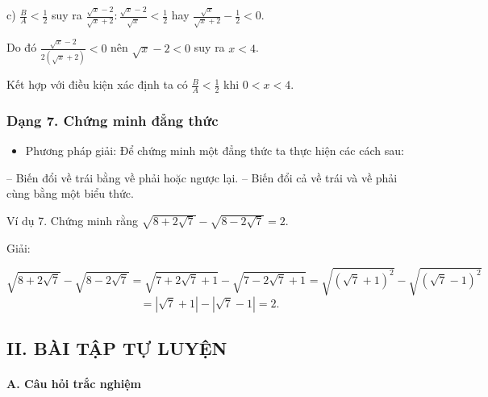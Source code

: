 \documentclass[%
    fontsize=12pt,%
    chapterprefix=false,%
    open=right,%
    twoside=false,%
    numbers=noenddot,%
    headings=optiontohead,%
    final,%
    DIV=15,%
    parskip=half %
]{scrbook}
\begin{document}
c) $ \frac{B}{A} < \frac{1}{2} $ suy ra $ \frac{\sqrt{x}-2}{\sqrt{x}+2} : \frac{\sqrt{x}-2}{\sqrt{x}} < \frac{1}{2} $ hay $ \frac{\sqrt{x}}{\sqrt{x}+2} - \frac{1}{2} < 0 $.

Do đó $ \frac{\sqrt{x}-2}{2(\sqrt{x}+2)} < 0 $ nên $ \sqrt{x}-2 < 0 $ suy ra $ x < 4 $.

Kết hợp với điều kiện xác định ta có $ \frac{B}{A} < \frac{1}{2} $ khi $ 0 < x < 4 $.
\subsubsection{Dạng 7. Chứng minh đẳng thức}

\begin{itemize}
  \item Phương pháp giải: Để chứng minh một đẳng thức ta thực hiện các cách sau:
\end{itemize}

  -- Biến đổi về trái bằng về phải hoặc ngược lại.   -- Biến đổi cả về trái và về phải cùng bằng một biểu thức.

Ví dụ 7. Chứng minh rằng $ \sqrt{8+2\sqrt{7}}-\sqrt{8-2\sqrt{7}}=2 $.

Giải:

\[
\sqrt{8+2\sqrt{7}}-\sqrt{8-2\sqrt{7}}=\sqrt{7+2\sqrt{7}+1}-\sqrt{7-2\sqrt{7}+1}=\sqrt{(\sqrt{7}+1)^2}-\sqrt{(\sqrt{7}-1)^2}
\]
\[
=|\sqrt{7}+1|-|\sqrt{7}-1|=2.
\]
\subsection{II. BÀI TẬP TỰ LUYỆN}
\paragraph{A. Câu hỏi trắc nghiệm}
\end{document}
